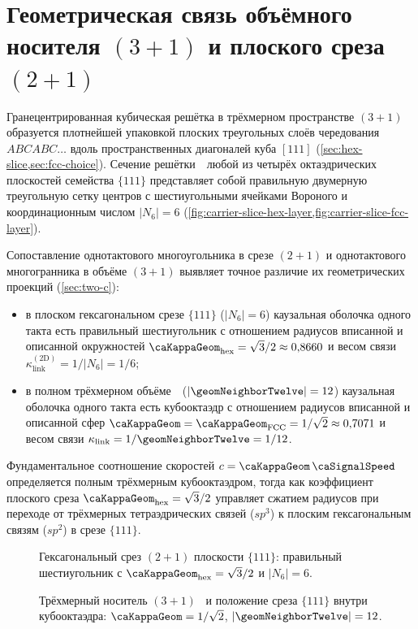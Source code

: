 \section{Геометрическая связь объёмного носителя $(3{+}1)$ и плоского среза $(2{+}1)$}
\label{sec:31-21-slice}

Гранецентрированная кубическая решётка в трёхмерном пространстве $(3{+}1)$ образуется плотнейшей упаковкой плоских треугольных слоёв чередования $ABCABC\ldots$ вдоль пространственных диагоналей куба $[111]$ (\cref{sec:hex-slice,sec:fcc-choice}).
Сечение решётки~\latGCKshort\ любой из четырёх октаэдрических плоскостей семейства $\{111\}$ представляет собой правильную двумерную треугольную сетку центров с шестиугольными ячейками Вороного и координационным числом $|N_6| = 6$ (\cref{fig:carrier-slice-hex-layer,fig:carrier-slice-fcc-layer}).

Сопоставление однотактового многоугольника в срезе $(2{+}1)$ и однотактового многогранника в объёме $(3{+}1)$ выявляет точное различие их геометрических проекций (\cref{sec:two-c}):
\begin{itemize}[noitemsep]
\item в плоском гексагональном срезе $\{111\}$ ($|N_6| = 6$) каузальная оболочка одного такта есть правильный шестиугольник с отношением радиусов вписанной и описанной окружностей $\caKappaGeom_{\mathrm{hex}} = \sqrt{3}/2 \approx 0{,}8660$ и весом связи $\kappa_{\mathrm{link}}^{(2\mathrm{D})} = 1/|N_6| = 1/6$;
\item в полном трёхмерном объёме~\latGCKshort\ ($|\geomNeighborTwelve| = 12$) каузальная оболочка одного такта есть кубооктаэдр с отношением радиусов вписанной и описанной сфер $\caKappaGeom = \caKappaGeom_{\mathrm{FCC}} = 1/\sqrt{2} \approx 0{,}7071$ и весом связи $\kappa_{\mathrm{link}} = 1/\geomNeighborTwelve = 1/12$.
\end{itemize}
Фундаментальное соотношение скоростей $c = \caKappaGeom\,\caSignalSpeed$ определяется полным трёхмерным кубооктаэдром, тогда как коэффициент плоского среза $\caKappaGeom_{\mathrm{hex}} = \sqrt{3}/2$ управляет сжатием радиусов при переходе от трёхмерных тетраэдрических связей ($sp^3$) к плоским гексагональным связям ($sp^2$) в срезе $\{111\}$.

\begin{figure}[htbp]
  \centering
  
  \caption{Гексагональный срез $(2{+}1)$ плоскости $\{111\}$: правильный шестиугольник с $\caKappaGeom_{\mathrm{hex}}=\sqrt{3}/2$ и $|N_6|=6$.}
  \label{fig:carrier-slice-hex-layer}
\end{figure}

\begin{figure}[htbp]
  \centering
  
  \caption{Трёхмерный носитель $(3{+}1)$ \latGCKshort\ и положение среза $\{111\}$ внутри кубооктаэдра: $\caKappaGeom=1/\sqrt{2}$, $|\geomNeighborTwelve|=12$.}
  \label{fig:carrier-slice-fcc-layer}
\end{figure}
